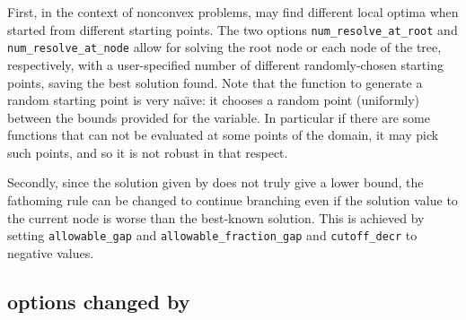 First, in the context of nonconvex problems, \IPOPT may find different local optima when started
from different starting points. The two options {\tt num\_re\-solve\_at\_root} and {\tt num\_resolve\_at\_node}
allow for solving the root node or each node of the tree, respectively, with a user-specified
number of different randomly-chosen starting points, saving the best solution found.
Note that the function to generate a random starting point is very na\"{\i}ve:
it chooses a random point (uniformly) between the bounds provided for the variable.
In particular if there are some functions that can not be evaluated at some points of the domain, it may pick such points,
and so it is not robust in that respect.

Secondly, since the solution given by \IPOPT does not truly give a lower bound, the fathoming rule can be changed to continue branching even if the solution value to the current node is worse than the best-known solution.
This is achieved by setting {\tt allowable\_gap}
and {\tt allowable\_fraction\_gap} and {\tt cutoff\_decr} to negative values.

\subsection{\IPOPT options changed by \BONMIN}

